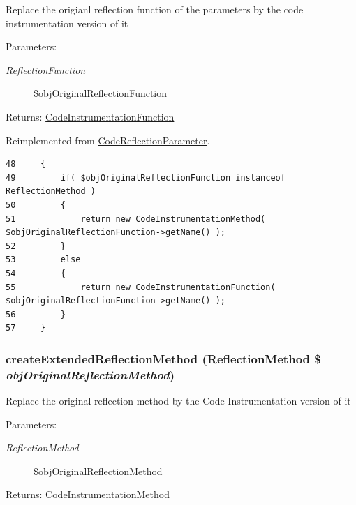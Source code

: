 Replace the origianl reflection function of the parameters by the code instrumentation version of it

\begin{Desc}
\item[Parameters:]
\begin{description}
\item[{\em ReflectionFunction}]\$objOriginalReflectionFunction \end{description}
\end{Desc}
\begin{Desc}
\item[Returns:]\hyperlink{class_code_instrumentation_function}{CodeInstrumentationFunction} \end{Desc}


Reimplemented from \hyperlink{class_code_reflection_parameter_b23ad87d3ac2f376c1a133ca6d27f031}{CodeReflectionParameter}.

\begin{Code}\begin{verbatim}48     {
49         if( $objOriginalReflectionFunction instanceof ReflectionMethod )
50         {
51             return new CodeInstrumentationMethod( $objOriginalReflectionFunction->getName() );
52         }
53         else
54         {
55             return new CodeInstrumentationFunction( $objOriginalReflectionFunction->getName() );
56         }
57     }
\end{verbatim}
\end{Code}


\hypertarget{class_code_instrumentation_parameter_ec7c1d4b204b6e3a6291d3b867afb688}{
\subsubsection[{createExtendedReflectionMethod}]{\setlength{\rightskip}{0pt plus 5cm}createExtendedReflectionMethod (ReflectionMethod \$ {\em objOriginalReflectionMethod})}}
\label{class_code_instrumentation_parameter_ec7c1d4b204b6e3a6291d3b867afb688}


Replace the original reflection method by the Code Instrumentation version of it

\begin{Desc}
\item[Parameters:]
\begin{description}
\item[{\em ReflectionMethod}]\$objOriginalReflectionMethod \end{description}
\end{Desc}
\begin{Desc}
\item[Returns:]\hyperlink{class_code_instrumentation_method}{CodeInstrumentationMethod} \end{Desc}


